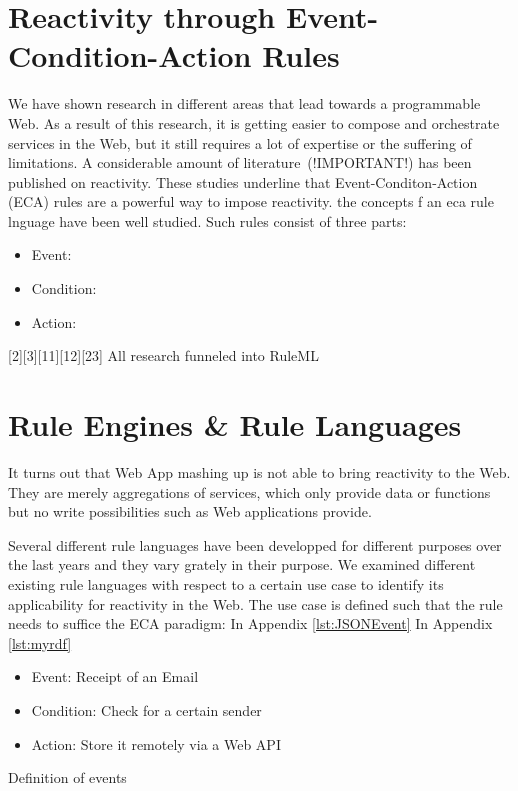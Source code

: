 \section{Reactivity through Event-Condition-Action Rules}
We have shown research in different areas that lead towards a programmable Web.
As a result of this research, it is getting easier to compose and orchestrate services in the Web, but it still requires a lot of expertise or the suffering of limitations.
A considerable amount of literature~\cite{2007_AlferesR3}(!IMPORTANT!)\cite{2005-Bry_etal-XChange.pdf}\cite{10.1007-11896548_63}\cite{2012-Paschke_etal-ReactionRuleML.pdf} has been published on reactivity.
These studies underline that Event-Conditon-Action (\textrm{ECA}) rules are a powerful way to impose reactivity.
the concepts f an eca rule lnguage have been well studied. 
Such rules consist of three parts:
\begin{itemize}
  \item Event:
  \item Condition:
  \item Action:
\end{itemize}
 [2][3][11][12][23]
All research funneled into RuleML


\section{Rule Engines \& Rule Languages}

It turns out that Web App mashing up is not able to bring reactivity to the Web.
They are merely aggregations of services, which only provide data or functions but no write possibilities such as Web applications provide.



Several different rule languages have been developped for different purposes over the last years and they vary grately in their purpose.
We examined different existing rule languages with respect to a certain use case to identify its applicability for reactivity in the Web. %
The use case is defined such that the rule needs to suffice the ECA paradigm:
In Appendix \ref{lst:JSONEvent}
In Appendix \ref{lst:myrdf}
\begin{itemize}
  \item Event: Receipt of an Email
  \item Condition: Check for a certain sender
  \item Action: Store it remotely via a Web API
\end{itemize}
Definition of events\cite{Adaikkalavan2007}




